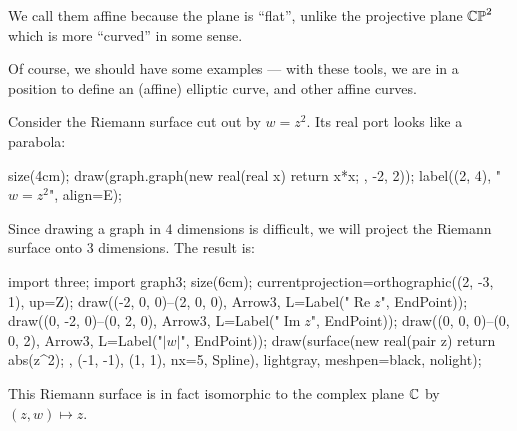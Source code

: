 We call them affine because the plane is ``flat'', unlike the projective plane $\mathbb{CP}^2$ which is
more ``curved'' in some sense.

Of course, we should have some examples --- with these tools, we are in a position to define an
(affine) elliptic curve, and other affine curves.

\begin{example}[A parabola]
	Consider the Riemann surface cut out by $w = z^2$.
	Its real port looks like a parabola:
	\begin{center}
		\begin{asy}
			size(4cm);
			draw(graph.graph(new real(real x){ return x*x; }, -2, 2));
			label((2, 4), "$w=z^2$", align=E);
		\end{asy}
	\end{center}
	Since drawing a graph in $4$ dimensions is difficult, we will project the Riemann surface onto
	$3$ dimensions.
	The result is:
	\begin{center}
		\begin{asy}
			import three;
			import graph3;
			size(6cm);
			currentprojection=orthographic((2, -3, 1), up=Z);
			draw((-2, 0, 0)--(2, 0, 0), Arrow3, L=Label("$\operatorname{Re} z$", EndPoint));
			draw((0, -2, 0)--(0, 2, 0), Arrow3, L=Label("$\operatorname{Im} z$", EndPoint));
			draw((0, 0, 0)--(0, 0, 2), Arrow3, L=Label("$|w|$", EndPoint));
			draw(surface(new real(pair z){ return abs(z^2); }, (-1, -1), (1, 1), nx=5, Spline),
			lightgray, meshpen=black, nolight);
		\end{asy}
	\end{center}

	This Riemann surface is in fact isomorphic to the complex plane $\mathbb C$ by $(z, w) \mapsto z$.
\end{example}

